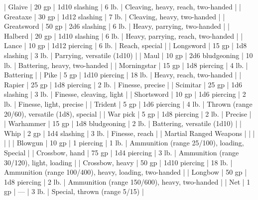 | Glaive                       | 20 gp | 1d10 slashing   | 6 lb.   | Cleaving, heavy, reach, two-handed                     |
| Greataxe                     | 30 gp | 1d12 slashing   | 7 lb.   | Cleaving, heavy, two-handed                            |
| Greatsword                   | 50 gp | 2d6 slashing    | 6 lb.   | Heavy, parrying, two-handed                            |
| Halberd                      | 20 gp | 1d10 slashing   | 6 lb.   | Heavy, parrying, reach, two-handed                     |
| Lance                        | 10 gp | 1d12 piercing   | 6 lb.   | Reach, special                                         |
| Longsword                    | 15 gp | 1d8 slashing    | 3 lb.   | Parrying, versatile (1d10)                             |
| Maul                         | 10 gp | 2d6 bludgeoning | 10 lb.  | Battering, heavy, two-handed                           |
| Morningstar                  | 15 gp | 1d8 piercing    | 4 lb.   | Battering                                              |
| Pike                         | 5 gp  | 1d10 piercing   | 18 lb.  | Heavy, reach, two-handed                               |
| Rapier                       | 25 gp | 1d8 piercing    | 2 lb.   | Finesse, precise                                       |
| Scimitar                     | 25 gp | 1d6 slashing    | 3 lb.   | Finesse, cleaving, light                               |
| Shortsword                   | 10 gp | 1d6 piercing    | 2 lb.   | Finesse, light, precise                                |
| Trident                      | 5 gp  | 1d6 piercing    | 4 lb.   | Thrown (range 20/60), versatile (1d8), special         |
| War pick                     | 5 gp  | 1d8 piercing    | 2 lb.   | Precise                                                |
| Warhammer                    | 15 gp | 1d8 bludgeoning | 2 lb.   | Battering, versatile (1d10)                            |
| Whip                         | 2 gp  | 1d4 slashing    | 3 lb.   | Finesse, reach                                         |
| Martial Ranged Weapons |       |                 |         |                                                        |
| Blowgun                      | 10 gp | 1 piercing      | 1 lb.   | Ammunition (range 25/100), loading, Special            |
| Crossbow, hand               | 75 gp | 1d4 piercing    | 3 lb.   | Ammunition (range 30/120), light, loading              |
| Crossbow, heavy              | 50 gp | 1d10 piercing   | 18 lb.  | Ammunition (range 100/400), heavy, loading, two-handed |
| Longbow                      | 50 gp | 1d8 piercing    | 2 lb.   | Ammunition (range 150/600), heavy, two-handed          |
| Net                          | 1 gp  | —               | 3 lb.   | Special, thrown (range 5/15)                           |

